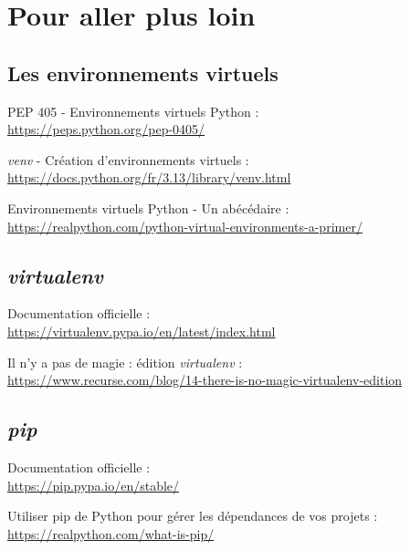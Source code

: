 \chapter{Pour aller plus loin}

\section*{Les environnements virtuels}
\begin{coloredenum}
    \item PEP 405 - Environnements virtuels Python :\\ \url{https://peps.python.org/pep-0405/}
    \item \textit{venv} - Création d'environnements virtuels :\\ \url{https://docs.python.org/fr/3.13/library/venv.html}
    \item Environnements virtuels Python - Un abécédaire : \\ \url{https://realpython.com/python-virtual-environments-a-primer/}
\end{coloredenum}

\section*{\textit{virtualenv}}
\begin{coloredenum}
    \item Documentation officielle :\\ \url{https://virtualenv.pypa.io/en/latest/index.html}
    \item Il n'y a pas de magie : édition \textit{virtualenv} :\\ \url{https://www.recurse.com/blog/14-there-is-no-magic-virtualenv-edition}
\end{coloredenum}

\section*{\textit{pip}}
\begin{coloredenum}
    \item Documentation officielle :\\ \url{https://pip.pypa.io/en/stable/}
    \item Utiliser pip de Python pour gérer les dépendances de vos projets :\\ \url{https://realpython.com/what-is-pip/}
\end{coloredenum}
